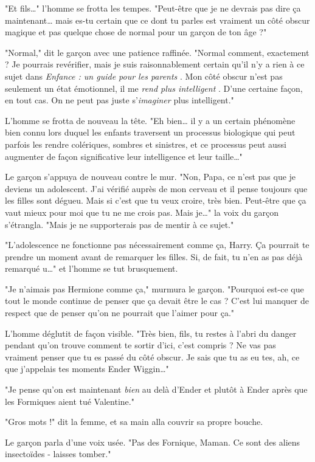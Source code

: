 "Et fils…" l'homme se frotta les tempes. "Peut-être que je ne devrais pas dire ça maintenant… mais es-tu certain que ce dont tu parles est vraiment un côté obscur magique et pas quelque chose de normal pour un garçon de ton âge ?"

"Normal," dit le garçon avec une patience raffinée. "Normal comment, exactement ? Je pourrais revérifier, mais je suis raisonnablement certain qu'il n'y a rien à ce sujet dans \emph{Enfance : un guide pour les parents} . Mon côté obscur n'est pas seulement un état émotionnel, il me \emph{rend plus intelligent} . D'une certaine façon, en tout cas. On ne peut pas juste s'\emph{imaginer}  plus intelligent."

L'homme se frotta de nouveau la tête. "Eh bien… il y a un certain phénomène bien connu lors duquel les enfants traversent un processus biologique qui peut parfois les rendre colériques, sombres et sinistres, et ce processus peut aussi augmenter de façon significative leur intelligence et leur taille…"

Le garçon s'appuya de nouveau contre le mur. "Non, Papa, ce n'est pas que je deviens un adolescent. J'ai vérifié auprès de mon cerveau et il pense toujours que les filles sont dégueu. Mais si c'est que tu veux croire, très bien. Peut-être que ça vaut mieux pour moi que tu ne me crois pas. Mais je…" la voix du garçon s'étrangla. "Mais je ne supporterais pas de mentir à ce sujet."

"L'adolescence ne fonctionne pas nécessairement comme ça, Harry. Ça pourrait te prendre un moment avant de remarquer les filles. Si, de fait, tu n'en as pas déjà remarqué u…" et l'homme se tut brusquement.

"Je n'aimais pas Hermione comme ça," murmura le garçon. "Pourquoi est-ce que tout le monde continue de penser que ça devait être le cas ? C'est lui manquer de respect que de penser qu'on ne pourrait que l'aimer pour ça."

L'homme déglutit de façon visible. "Très bien, fils, tu restes à l'abri du danger pendant qu'on trouve comment te sortir d'ici, c'est compris ? Ne vas pas vraiment penser que tu es passé du côté obscur. Je sais que tu as eu tes, ah, ce que j'appelais tes moments Ender Wiggin…"

"Je pense qu'on est maintenant \emph{bien}  au delà d'Ender et plutôt à Ender après que les Formiques aient tué Valentine."

"Gros mots !" dit la femme, et sa main alla couvrir sa propre bouche.

Le garçon parla d'une voix usée. "Pas des Fornique, Maman. Ce sont des aliens insectoïdes - laisses tomber."

